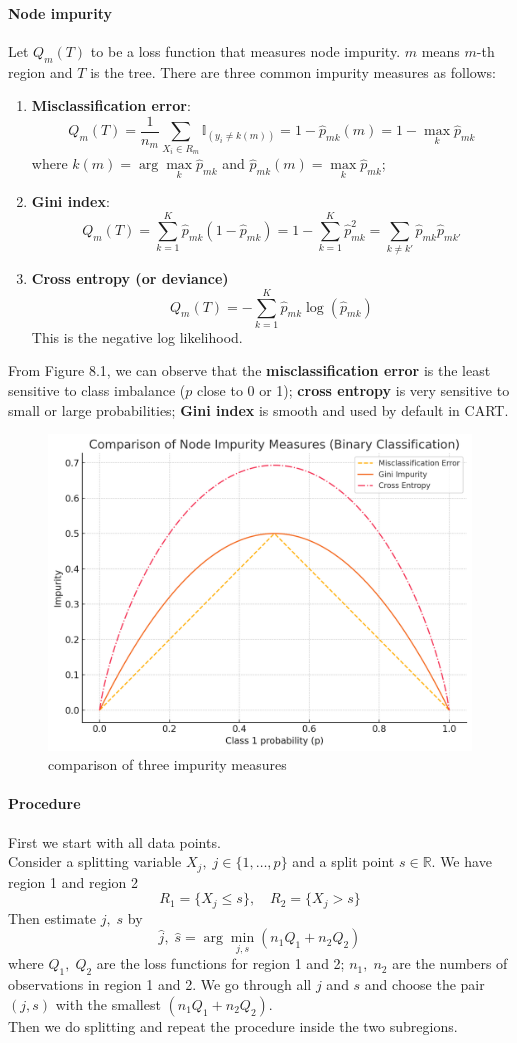 \documentclass[12pt]{book}
\theoremstyle{definition}
\theoremstyle{remark}
\newcommand{\R}{\mathbb{R}}
\begin{document}
\paragraph{Node impurity} Let $Q_m(T)$ to be a loss function that measures node impurity. $m$ means $m$-th region and $T$ is the tree. There are three common impurity measures as follows:
\begin{enumerate}
    \item \textbf{Misclassification error}:
    \[Q_m(T) = \frac1{n_m}\sum_{X_i\in R_m} \mathbb{I}_{(y_i \ne k(m))} = 1-\hat{p}_{mk}(m) = 1 - \underset{k}{\max} \hat{p}_{mk}\]
    where $k(m) = \arg \underset{k}{\max} \hat{p}_{mk}$ and $\hat{p}_{mk}(m) = \underset{k}{\max} \hat{p}_{mk}$;
    \item \textbf{Gini index}:
    \[Q_m(T) = \sum_{k=1}^K \hat{p}_{mk}(1-\hat{p}_{mk}) = 1 - \sum_{k=1}^K \hat{p}_{mk}^2 = \sum_{k \ne k'}\hat{p}_{mk}\hat{p}_{mk'}\]
    \item \textbf{Cross entropy (or deviance)}
    \[Q_m(T) = - \sum_{k=1}^{K} \hat{p}_{mk} \log(\hat{p}_{mk})\]
    This is the negative log likelihood. 
\end{enumerate}


From Figure 8.1, we can observe that the \textbf{misclassification error} is the least sensitive to class imbalance ($p$ close to 0 or 1); \textbf{cross entropy} is very sensitive to small or large probabilities; \textbf{Gini index} is smooth and used by default in CART.

\begin{figure}
    \centering
    \includegraphics[width=0.5\linewidth]{601-8-1-1.png}
    \caption{comparison of three impurity measures}
    \label{601811}
\end{figure}


\paragraph{Procedure} First we start with all data points. \\
Consider a splitting variable $X_j,\; j \in \{1,\dots,p\}$ and a split point $s\in\R$. We have region 1 and region 2 
\[R_1 = \{X_j\le s\},\quad R_2 = \{X_j>s\}\]
Then estimate $j,\;s$ by \[\hat{j},\;\hat{s} = \arg\underset{j,s}{\min}(n_1Q_1+n_2Q_2)\] where $Q_1,\; Q_2$ are the loss functions for region 1 and 2; $n_1,\;n_2$ are the numbers of observations in region 1 and 2. We go through all $j$ and $s$ and choose the pair $(j,s)$ with the smallest $(n_1Q_1+n_2Q_2)$. \\
Then we do splitting and repeat the procedure inside the two subregions. \\
\end{document}
